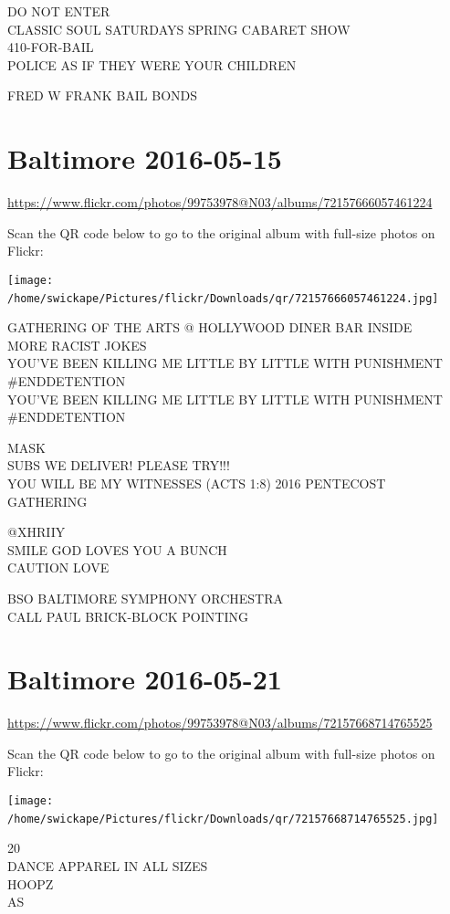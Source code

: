 \documentclass[10pt,letterpaper]{article}
\begin{document}
DO NOT ENTER\\
CLASSIC SOUL SATURDAYS SPRING CABARET SHOW\\
410{-}FOR{-}BAIL\\
POLICE AS IF THEY WERE YOUR CHILDREN

FRED W FRANK BAIL BONDS
\

\section*{Baltimore 2016-05-15}

\url{https://www.flickr.com/photos/99753978@N03/albums/72157666057461224}

Scan the QR code below to go to the original album with full-size photos on Flickr:

\texttt{[image: /home/swickape/Pictures/flickr/Downloads/qr/72157666057461224.jpg]}
\

GATHERING OF THE ARTS @ HOLLYWOOD DINER BAR INSIDE\\
MORE RACIST JOKES\\
YOU'VE BEEN KILLING ME LITTLE BY LITTLE WITH PUNISHMENT \#ENDDETENTION\\
YOU'VE BEEN KILLING ME LITTLE BY LITTLE WITH PUNISHMENT \#ENDDETENTION

MASK\\
SUBS WE DELIVER!  PLEASE TRY!!!\\
YOU WILL BE MY WITNESSES (ACTS 1:8) 2016 PENTECOST GATHERING

@XHRIIY\\
SMILE GOD LOVES YOU A BUNCH\\
CAUTION LOVE

BSO BALTIMORE SYMPHONY ORCHESTRA\\
CALL PAUL BRICK{-}BLOCK POINTING
\

\section*{Baltimore 2016-05-21}

\url{https://www.flickr.com/photos/99753978@N03/albums/72157668714765525}

Scan the QR code below to go to the original album with full-size photos on Flickr:

\texttt{[image: /home/swickape/Pictures/flickr/Downloads/qr/72157668714765525.jpg]}
\

20\\
DANCE APPAREL IN ALL SIZES\\
HOOPZ\\
AS
\end{document}
